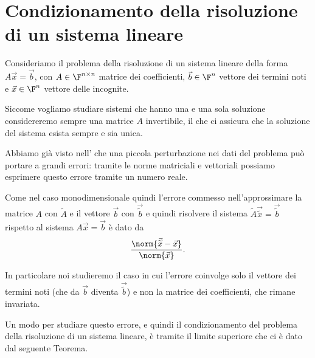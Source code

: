 \section{Condizionamento della risoluzione di un sistema lineare}

Consideriamo il problema della risoluzione di un sistema lineare della forma $A\vec x = \vec b$, con $A \in \Mat{\F, n, n}$ matrice dei coefficienti, $\vec b \in \F^n$ vettore dei termini noti e $\vec x \in \F^n$ vettore delle incognite.

Siccome vogliamo studiare sistemi che hanno una e una sola soluzione considereremo sempre una matrice $A$ invertibile, il che ci assicura che la soluzione del sistema esista sempre e sia unica.

Abbiamo già visto nell' che una piccola perturbazione nei dati del problema può portare a grandi errori: tramite le norme matriciali e vettoriali possiamo esprimere questo errore tramite un numero reale.

Come nel caso monodimensionale quindi l'errore commesso nell'approssimare la matrice $A$ con $\tilde A$ e il vettore $\vec b$ con $\vec{\tilde b}$ e quindi risolvere il sistema $\tilde{A}\vec{\tilde x} = \vec{\tilde b}$ rispetto al sistema $A\vec x = \vec b$ è dato da \[
    \frac{\norm{\vec{\tilde x} - \vec x}}{\norm{\vec x}}.
\]

In particolare noi studieremo il caso in cui l'errore coinvolge solo il vettore dei termini noti (che da $\vec b$ diventa $\vec{\tilde b}$) e non la matrice dei coefficienti, che rimane invariata.

Un modo per studiare questo errore, e quindi il condizionamento del problema della risoluzione di un sistema lineare, è tramite il limite superiore che ci è dato dal seguente Teorema.

